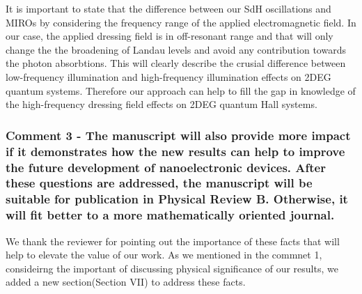\documentclass{article}
\begin{document}
\begin{itemize}
{  It is important to state that the difference between our SdH oscillations and MIROs \cite{zudov01,mani02,zudov03,mani04} by considering the frequency range of the applied electromagnetic field. In our case, the applied dressing field is in off-resonant range and that will only change the the broadening of Landau levels and avoid any contribution towards the photon absorbtions. This will clearly describe the crusial difference between low-frequency illumination and high-frequency illumination effects on 2DEG quantum systems. Therefore our approach can help to fill the gap in knowledge of the high-frequency dressing field effects on 2DEG quantum Hall systems.
  }
\end{itemize}

\subsubsection*{Comment 3 -
\color{RoyalBlue} The manuscript will also provide more impact if it demonstrates how the new results can help to improve the future development of nanoelectronic devices. After these questions are addressed, the manuscript will be suitable for publication in Physical Review B. Otherwise, it will fit better to a more mathematically oriented journal.
}

We thank the reviewer for pointing out the importance of these facts that will help to elevate the value of our work. As we mentioned in the commnet 1, consideirng the important of discussing physical significance of our results, we added a new section(Section VII) to address these facts.
\end{document}

